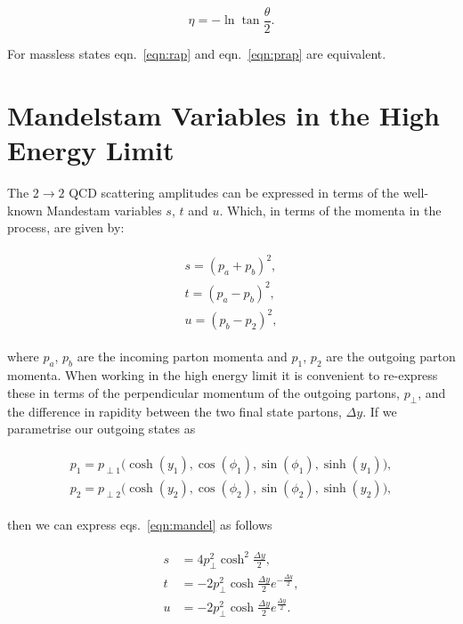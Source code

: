 	\begin{equation}
		\eta = -\ln\tan\frac{\theta}{2}.
		\label{eqn:prap}
	\end{equation}

	For massless states eqn.~\eqref{eqn:rap} and eqn.~\eqref{eqn:prap} are equivalent.

\section{Mandelstam Variables in the High Energy Limit}
	\label{sub:MandelstamVariables}

	The $2\rightarrow 2$ QCD scattering amplitudes can be expressed in terms of the well-known Mandestam
	variables $s$, $t$ and $u$.  Which, in terms of the momenta in the process, are given by:

	\begin{align}
	\begin{split}
		s = (p_a + p_b)^2, \\
		t = (p_a - p_b)^2, \\
		u = (p_b - p_2)^2,
		\label{eqn:mandel}
	\end{split}
	\end{align}

	where $p_a$, $p_b$ are the incoming parton momenta and $p_1$, $p_2$ are the outgoing parton momenta.
	When working in the high energy limit it is convenient to re-express these in terms of the
	perpendicular momentum of the outgoing partons, $p_\perp$, and the difference in rapidity
	between the two final state partons, $\Delta y$.  If we parametrise our outgoing states as

	\begin{align}
	\begin{split}
		p_1 = p_{\perp1}\big(\cosh (y_1), \cos(\phi_1), \sin(\phi_1), \sinh (y_1)\big),\\
		p_2 = p_{\perp2}\big(\cosh (y_2), \cos(\phi_2), \sin(\phi_2), \sinh (y_2)\big),
	\end{split}
	\end{align}

	then we can express eqs.~\eqref{eqn:mandel} as follows

	\begin{align}
	\begin{split}
		s &=  4p_\perp^2 \cosh^2\frac{\Delta y}{2}, \\
		t &= -2p_\perp^2 \cosh  \frac{\Delta y}{2}e^{-\frac{\Delta y}{2}}, \\
		u &= -2p_\perp^2 \cosh  \frac{\Delta y}{2}e^{ \frac{\Delta y}{2}}.
	\end{split}
	\end{align}

